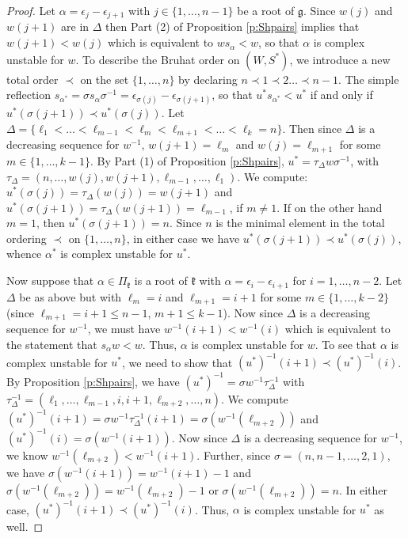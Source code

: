 \documentclass[12pt]{amsart}
\numberwithin{equation}{section}
\newcommand{\fk}{\mbox{${\mathfrak k}$}}
\newcommand{\fg}{\mbox{${\mathfrak g}$}}
\newcommand{\eps}{\epsilon}
\begin{document}
\begin{proof}
Let $\alpha=\eps_{j}-\eps_{j+1}$ with $j\in\{1,\dots, n-1\}$ be a root of $\fg$.  
Since $w(j)$ and $ w(j+1)$ are in $\Delta$ then Part (2) of Proposition \ref{p:Shpairs} implies that 
$w(j+1)<w(j)$ which is equivalent to $ws_{\alpha}<w$, so that $\alpha$ is complex unstable for $w$.  To describe the Bruhat order on $(W,S^{*})$, we 
 introduce a new total order $\prec$ on the set $\{1,\dots, n\}$ by declaring $n\prec 1\prec 2\dots \prec n-1$.  
The simple reflection $s_{\alpha^{*}}=\sigma s_{\alpha} \sigma^{-1}=\eps_{\sigma(j)}-\eps_{\sigma(j+1)}$, so that 
$u^{*}s_{\alpha^{*}}<u^{*}$ if and only if $u^{*}(\sigma(j+1))\prec u^{*}(\sigma(j)) .$ 
Let $\Delta=\{\ell_{1}<\dots <\ell_{m-1}< \ell_{m}<\ell_{m+1}<\dots <\ell_{k}=n\}$.  Then since 
$\Delta$ is a decreasing sequence for $w^{-1}$, $w(j+1)=\ell_{m}$ and $w(j)=\ell_{m+1}$ for 
some $m \in \{1,\dots, k-1\}$.  By Part (1) of Proposition \ref{p:Shpairs},
$u^{*}=\tau_{\Delta} w\sigma^{-1}$, with $\tau_{\Delta}=(n,\dots, w(j),w(j+1),\ell_{m-1}, \dots,\ell_{1}).$
We compute: 
$u^{*}(\sigma(j))=\tau_{\Delta}(w(j))=w(j+1)$ and $u^{*}(\sigma(j+1))=\tau_{\Delta}(w(j+1))=\ell_{m-1}$, if $m\neq 1$.  If on the other hand $m=1$, then $u^{*}(\sigma(j+1))=n$.  Since $n$ is the minimal element in the total ordering $\prec$ on $\{1,\dots, n\}$, in either case we have $u^{*}(\sigma(j+1))\prec u^{*}(\sigma(j))$, whence $\alpha^{*}$ is complex unstable for $u^{*}$.  

Now suppose that $\alpha\in\Pi_{\fk}$ is a root of $\fk$ with 
$\alpha=\eps_{i}-\eps_{i+1}$ for $i=1,\dots, n-2$.  
Let $\Delta$ be as above but with $\ell_{m}=i$ and $\ell_{m+1}=i+1$ for some 
$m\in\{1,\dots, k-2\}$ (since $\ell_{m+1}=i+1 \le n-1$, $m+1 \le k-1$).  Now since 
$\Delta$ is a decreasing sequence for $w^{-1}$, we must have 
$w^{-1}(i+1)<w^{-1}(i)$ which is equivalent to the statement that 
$s_{\alpha}w<w$.  Thus, $\alpha$ is complex unstable for $w$.  
To see that $\alpha$ is complex unstable for $u^{*}$, we need to show that 
$(u^{*})^{-1}(i+1)\prec (u^{*})^{-1}(i)$.  By Proposition \ref{p:Shpairs}, we have 
$(u^{*})^{-1}=\sigma w^{-1} \tau_{\Delta}^{-1}$ with $\tau_{\Delta}^{-1}=(\ell_1,\dots, \ell_{m-1} , i, i+1, \ell_{m+2},\dots, n)$.   
We compute $(u^{*})^{-1}(i+1)=\sigma w^{-1}\tau_{\Delta}^{-1} (i+1)=\sigma (w^{-1}( \ell_{m+2}))$ and 
$(u^{*})^{-1}(i)=\sigma (w^{-1}(i+1))$.  Now since $\Delta$ is a decreasing sequence for $w^{-1}$, 
we know $w^{-1}(\ell_{m+2})<w^{-1}(i+1)$.  Further, since $\sigma=(n,n-1,\dots, 2,1)$, we have 
$\sigma(w^{-1}(i+1))=w^{-1}(i+1)-1$ and $\sigma(w^{-1}(\ell_{m+2}))=w^{-1}(\ell_{m+2})-1$ or $\sigma(w^{-1}(\ell_{m+2}))=n$.  In either case, 
$(u^{*})^{-1}(i+1)\prec (u^{*})^{-1}(i)$.  Thus, $\alpha$ is complex unstable for $u^{*}$ as well. 
\end{proof}
\end{document}
